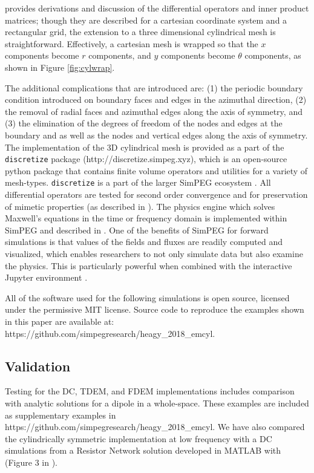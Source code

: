 \cite{Haber2014} provides derivations and discussion of the differential operators and inner product matrices; though they are described for a cartesian coordinate system and a rectangular grid, the extension to a three dimensional cylindrical mesh is straightforward. Effectively, a cartesian mesh is wrapped so that the $x$ components become $r$ components, and $y$ components become $\theta$ components, as shown in Figure \ref{fig:cylwrap}.




The additional complications that are introduced are: (1) the periodic boundary condition introduced on boundary faces and edges in the azimuthal direction, (2) the removal of radial faces and azimuthal edges along the axis of symmetry, and (3) the elimination of the degrees of freedom of the nodes and edges at the boundary and as well as the nodes and vertical edges along the axis of symmetry. The implementation of the 3D cylindrical mesh is provided as a part of the \texttt{discretize} package (http://discretize.simpeg.xyz), which is an open-source python package that contains finite volume operators and utilities for a variety of mesh-types. \texttt{discretize} is a part of the larger SimPEG ecosystem \citep{Cockett2015}. All differential operators are tested for second order convergence and for preservation of mimetic properties (as described in \cite{Haber2014}).  The physics engine which solves Maxwell's equations in the time or frequency domain is implemented within SimPEG and described in \cite{Heagy2017}. One of the benefits of SimPEG for forward simulations is that values of the fields and fluxes are readily computed and visualized, which enables researchers to not only simulate data but also examine the physics. This is particularly powerful when combined with the interactive Jupyter environment \citep{Perez2015}.

All of the software used for the following simulations is open source, licensed under the permissive MIT license.  Source code to reproduce the examples shown in this paper are available at: https://github.com/simpegresearch/heagy\_2018\_emcyl.


\subsection{Validation}

Testing for the DC, TDEM, and FDEM implementations includes comparison with analytic solutions for a dipole in a whole-space. These examples are included as supplementary examples in https://github.com/simpegresearch/heagy\_2018\_emcyl. We have also compared the cylindrically symmetric implementation at low frequency with a DC simulations from a Resistor Network solution developed in MATLAB with (Figure 3 in \cite{Yang2016}).

